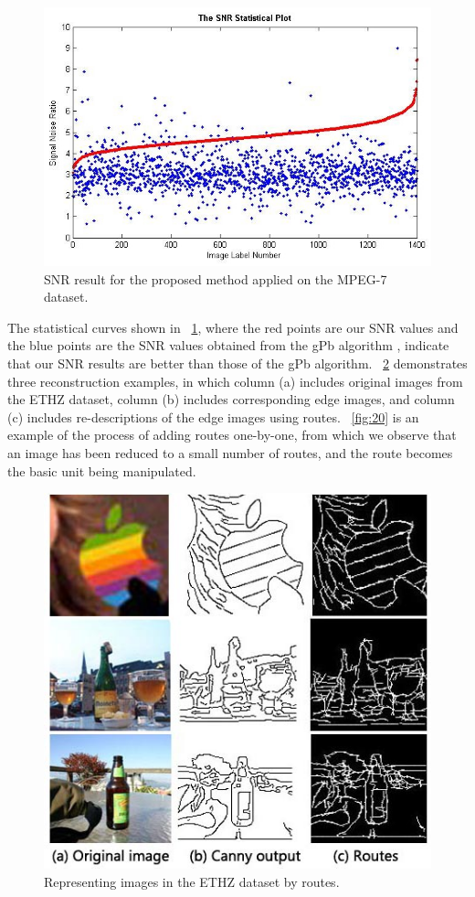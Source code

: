 \documentclass{article}
\begin{document}
\begin{figure}[!t]
\centering
\includegraphics[width=0.7\linewidth]{images/fig18.jpg}
\caption{SNR result for the proposed method applied on the MPEG-7 dataset.}
\label{fig:18}
\end{figure}

The statistical curves shown in \figurename~\ref{fig:18}, 
where the red points are our SNR values and the blue points are the SNR values obtained from the gPb algorithm 
\cite{maire2008}, indicate that our SNR results are better than those of the gPb algorithm.
\figurename~\ref{fig:19} demonstrates three reconstruction examples,
in which column (a) includes original images from the ETHZ dataset, 
column (b) includes corresponding edge images, 
and column (c) includes re-descriptions of the edge images using routes.
\figurename~\ref{fig:20} is an example of the process of adding routes one-by-one, 
from which we observe that an image has been reduced to a small number of routes, and the route becomes the basic unit being manipulated.

\begin{figure}[!t]
\centering
\includegraphics[width=0.7\linewidth]{images/fig19.jpg}
\caption{Representing images in the ETHZ dataset by routes.}
\label{fig:19}
\end{figure}
\end{document}
